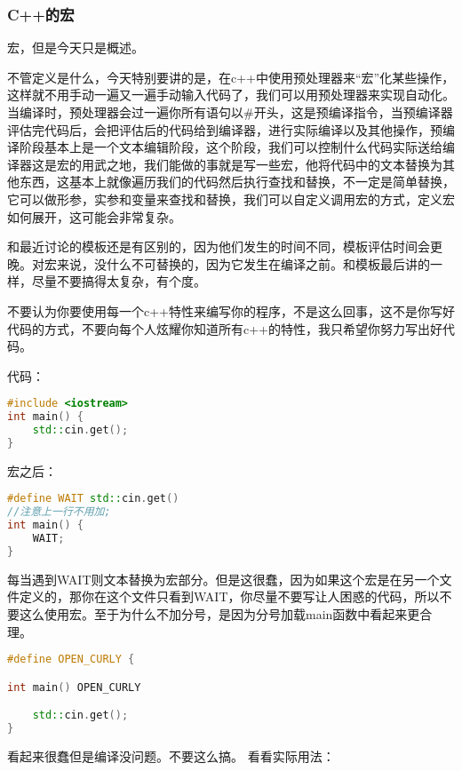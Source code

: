 \subsubsection{C++的宏}

宏，但是今天只是概述。

不管定义是什么，今天特别要讲的是，在c++中使用预处理器来“宏”化某些操作，这样就不用手动一遍又一遍手动输入代码了，我们可以用预处理器来实现自动化。当编译时，预处理器会过一遍你所有语句以{\ncodestyle \#}开头，这是预编译指令，当预编译器评估完代码后，会把评估后的代码给到编译器，进行实际编译以及其他操作，预编译阶段基本上是一个文本编辑阶段，这个阶段，我们可以控制什么代码实际送给编译器这是宏的用武之地，我们能做的事就是写一些宏，他将代码中的文本替换为其他东西，这基本上就像遍历我们的代码然后执行查找和替换，不一定是简单替换，它可以做形参，实参和变量来查找和替换，我们可以自定义调用宏的方式，定义宏如何展开，这可能会非常复杂。


和最近讨论的模板还是有区别的，因为他们发生的时间不同，模板评估时间会更晚。对宏来说，没什么不可替换的，因为它发生在编译之前。和模板最后讲的一样，尽量不要搞得太复杂，有个度。

不要认为你要使用每一个c++特性来编写你的程序，不是这么回事，这不是你写好代码的方式，不要向每个人炫耀你知道所有c++的特性，我只希望你努力写出好代码。

代码：

\begin{lstlisting}[language=c++]
#include <iostream>
int main() {
    std::cin.get();
}
\end{lstlisting}

宏之后：

\begin{lstlisting}[language=c++]
#define WAIT std::cin.get()
//注意上一行不用加;
int main() {
    WAIT;
}
\end{lstlisting}

每当遇到WAIT则文本替换为宏部分。但是这很蠢，因为如果这个宏是在另一个文件定义的，那你在这个文件只看到{\ncodestyle WAIT}，你尽量不要写让人困惑的代码，所以不要这么使用宏。至于为什么不加分号，是因为分号加载main函数中看起来更合理。

\begin{lstlisting}[language=c++]
#define OPEN_CURLY {

int main() OPEN_CURLY

    std::cin.get();
}
\end{lstlisting}

看起来很蠢但是编译没问题。不要这么搞。
看看实际用法：

